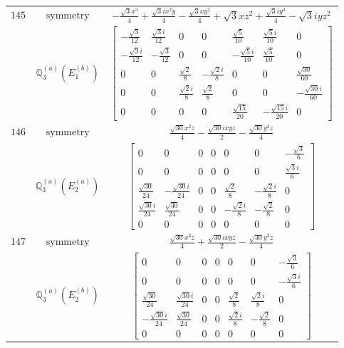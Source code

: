 \documentclass[fleqn,8pt,landscape]{jsarticle}
\begin{document}
\begin{longtable}{ccc}
$ 145 $ & $ \text{symmetry} $ & $ - \frac{\sqrt{3} x^{3}}{4} + \frac{\sqrt{3} i x^{2} y}{4} - \frac{\sqrt{3} x y^{2}}{4} + \sqrt{3} x z^{2} + \frac{\sqrt{3} i y^{3}}{4} - \sqrt{3} i y z^{2} $ \\
$  $ & $ \mathbb{Q}_{3}^{(a)}(E_{1}^{(b)}) $ & $ \begin{bmatrix} - \frac{\sqrt{3}}{12} & \frac{\sqrt{3} i}{12} & 0 & 0 & \frac{\sqrt{5}}{10} & \frac{\sqrt{5} i}{10} & 0 \\ - \frac{\sqrt{3} i}{12} & - \frac{\sqrt{3}}{12} & 0 & 0 & - \frac{\sqrt{5} i}{10} & \frac{\sqrt{5}}{10} & 0 \\ 0 & 0 & \frac{\sqrt{2}}{8} & - \frac{\sqrt{2} i}{8} & 0 & 0 & \frac{\sqrt{30}}{60} \\ 0 & 0 & \frac{\sqrt{2} i}{8} & \frac{\sqrt{2}}{8} & 0 & 0 & - \frac{\sqrt{30} i}{60} \\ 0 & 0 & 0 & 0 & \frac{\sqrt{15}}{20} & - \frac{\sqrt{15} i}{20} & 0 \end{bmatrix} $ \\ \hline
$ 146 $ & $ \text{symmetry} $ & $ \frac{\sqrt{30} x^{2} z}{4} - \frac{\sqrt{30} i x y z}{2} - \frac{\sqrt{30} y^{2} z}{4} $ \\
$  $ & $ \mathbb{Q}_{3}^{(a)}(E_{2}^{(a)}) $ & $ \begin{bmatrix} 0 & 0 & 0 & 0 & 0 & 0 & - \frac{\sqrt{3}}{6} \\ 0 & 0 & 0 & 0 & 0 & 0 & \frac{\sqrt{3} i}{6} \\ \frac{\sqrt{30}}{24} & - \frac{\sqrt{30} i}{24} & 0 & 0 & \frac{\sqrt{2}}{8} & - \frac{\sqrt{2} i}{8} & 0 \\ \frac{\sqrt{30} i}{24} & \frac{\sqrt{30}}{24} & 0 & 0 & - \frac{\sqrt{2} i}{8} & - \frac{\sqrt{2}}{8} & 0 \\ 0 & 0 & 0 & 0 & 0 & 0 & 0 \end{bmatrix} $ \\ \hline
$ 147 $ & $ \text{symmetry} $ & $ \frac{\sqrt{30} x^{2} z}{4} + \frac{\sqrt{30} i x y z}{2} - \frac{\sqrt{30} y^{2} z}{4} $ \\
$  $ & $ \mathbb{Q}_{3}^{(a)}(E_{2}^{(b)}) $ & $ \begin{bmatrix} 0 & 0 & 0 & 0 & 0 & 0 & - \frac{\sqrt{3}}{6} \\ 0 & 0 & 0 & 0 & 0 & 0 & - \frac{\sqrt{3} i}{6} \\ \frac{\sqrt{30}}{24} & \frac{\sqrt{30} i}{24} & 0 & 0 & \frac{\sqrt{2}}{8} & \frac{\sqrt{2} i}{8} & 0 \\ - \frac{\sqrt{30} i}{24} & \frac{\sqrt{30}}{24} & 0 & 0 & \frac{\sqrt{2} i}{8} & - \frac{\sqrt{2}}{8} & 0 \\ 0 & 0 & 0 & 0 & 0 & 0 & 0 \end{bmatrix} $ \\ \hline

\end{longtable}
\end{document}
